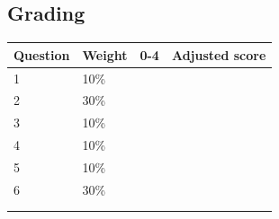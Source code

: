 \documentclass[a4paper,12pt]{book}
\begin{document}
    \hrulefill{}

    \subsection*{Grading}
    
    \begin{center}
        
        \begin{tabular}{ | l | l | l | l | }
            \hline
            \textbf{ Question } & \textbf{ Weight } & \textbf{ 0-4 } & \textbf{ Adjusted score }
            \\ \hline{}
            
            1 & 10\% & &    \\ \hline
            2 & 30\% & &    \\ \hline
            3 & 10\% & &    \\ \hline
            4 & 10\% & &    \\ \hline
            5 & 10\% & &    \\ \hline
            6 & 30\% & &    \\ \hline
            & & & \\ \hline
            & & & \\ \hline
            
            
        \end{tabular}
    \end{center}
\end{document}
